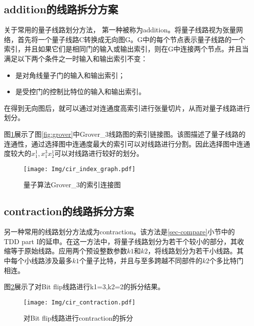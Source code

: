\subsection*{addition的线路拆分方案}
\label{addition}关于常用的量子线路划分方法，
第一种被称为addition\citep{chen2018classical}。将量子线路视为张量网络，首先将一个量子线路C转换成无向图G。G中的每个节点表示量子线路的一个索引，并且如果它们是相同门的输入或输出索引，则在G中连接两个节点。并且当满足以下两个条件之一时输入和输出索引不变：
\begin{itemize}
	\item 是对角线量子门的输入和输出索引；
	\item 是受控门的控制比特位的输入和输出索引。
\end{itemize}
在得到无向图后，就可以通过对连通度高索引进行张量切片，从而对量子线路进行划分。 
\begin{example}
    图\ref{fig:addition}展示了图\ref{fig:grover}中Grover\_3线路图的索引链接图。该图描述了量子线路的连通性，通过选择图中连通度最大的索引可以对线路进行分割。因此选择图中连通度较大的$x_1^1,x_1^3x_2^1$可以对线路进行较好的划分。
 
\begin{figure}[!htbp]
	\centering
	\texttt{[image: Img/cir\_index\_graph.pdf]}
	\caption{量子算法Grover\_3的索引连接图}
	\label{fig:addition}
\end{figure} 
\end{example}

\subsection*{contraction的线路拆分方案}
另一种常用的线路划分方法成为contraction。该方法是\ref{sec-compare}小节中的TDD part I的延申。在这一方法中，将量子线路划分为若干个较小的部分，其收缩等于原始线路。应用两个预设整数参数$k1$和$k2$，将线路划分为若干小线路。其中每个小线路涉及最多$k1$个量子比特，并且与至多跨越不同部件的$k2$个多比特门相连。
\begin{example}
    图\ref{fig:contraction}展示了对Bit flip线路进行k1=3,k2=2的拆分结果。
\begin{figure}[!htbp]
	\centering
	\texttt{[image: Img/cir\_contraction.pdf]}
	\caption{对Bit flip线路进行contraction的拆分}
	\label{fig:contraction}
\end{figure} 
\end{example}



